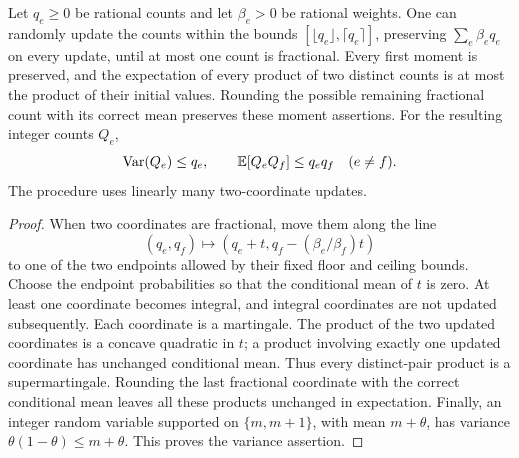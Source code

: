 \begin{lemma}\label{lem:prep-weighted-rounding}
Let $q_e\ge0$ be rational counts and let $\beta_e>0$ be rational weights.
One can randomly update the counts within the bounds
$[\lfloor q_e\rfloor,\lceil q_e\rceil]$, preserving
$\sum_e\beta_e q_e$ on every update, until at most one count is
fractional.  Every first moment is preserved, and the expectation of
every product of two distinct counts is at most the product of their
initial values.  Rounding the possible remaining fractional count with
its correct mean preserves these moment assertions.
For the resulting integer counts $Q_e$,
\[
 \operatorname{Var}(Q_e)\le q_e,\qquad
 \mathbb E[Q_eQ_f]\le q_eq_f\quad(e\ne f).
\]
The procedure uses linearly many two-coordinate updates.
\end{lemma}

\begin{proof}
When two coordinates are fractional, move them along the line
\[
 (q_e,q_f)\longmapsto
 (q_e+t,q_f-(\beta_e/\beta_f)t)
\]
to one of the two endpoints allowed by their fixed floor and ceiling
bounds.  Choose the endpoint probabilities so that the conditional
mean of $t$ is zero.  At least one coordinate becomes integral, and
integral coordinates are not updated subsequently.  Each coordinate
is a martingale.  The product of the two updated coordinates is a
concave quadratic in $t$; a product involving exactly one updated
coordinate has unchanged conditional mean.  Thus every distinct-pair
product is a supermartingale.  Rounding the last fractional coordinate
with the correct conditional mean leaves all these products unchanged
in expectation.  Finally, an integer random variable supported on
$\{m,m+1\}$, with mean $m+\theta$, has variance
$\theta(1-\theta)\le m+\theta$.  This proves the variance assertion.
\end{proof}

